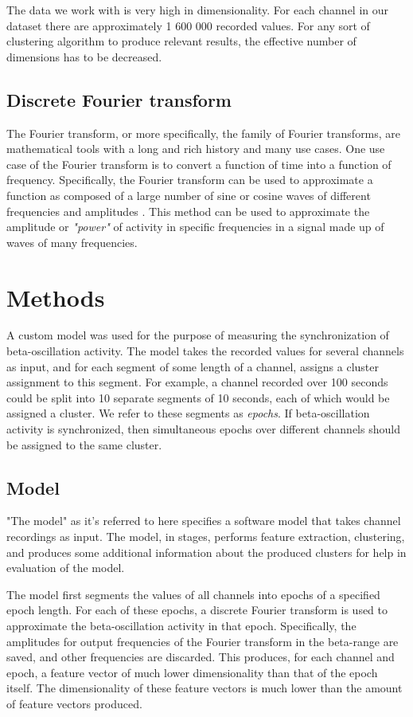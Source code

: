 \documentclass{article}
\begin{document}
The data we work with is very high in dimensionality. For each channel in our dataset there are approximately 1 600 000 recorded values. For any sort of clustering algorithm to produce relevant results, the effective number of dimensions has to be decreased. 

\subsection{Discrete Fourier transform}
The Fourier transform, or more specifically, the family of Fourier transforms, are mathematical tools with a long and rich history and many use cases. One use case of the Fourier transform is to convert a function of time into a function of frequency. Specifically, the Fourier transform can be used to approximate a function as composed of a large number of sine or cosine waves of different frequencies and amplitudes \citep{Fourier}. This method can be used to approximate the amplitude or \textit{"power"} of activity in specific frequencies in a signal made up of waves of many frequencies. 

\newpage
\section{Methods}
A custom model was used for the purpose of measuring the synchronization of beta-oscillation activity. The model takes the recorded values for several channels as input, and for each segment of some length of a channel, assigns a cluster assignment to this segment. For example, a channel recorded over 100 seconds could be split into 10 separate segments of 10 seconds, each of which would be assigned a cluster. We refer to these segments as \textit{epochs}. If beta-oscillation activity is synchronized, then simultaneous epochs over different channels should be assigned to the same cluster.

\subsection{Model}
"The model" as it's referred to here specifies a software model that takes channel recordings as input. The model, in stages, performs feature extraction, clustering, and produces some additional information about the produced clusters for help in evaluation of the model. 

The model first segments the values of all channels into epochs of a specified epoch length. For each of these epochs, a discrete Fourier transform is used to approximate the beta-oscillation activity in that epoch. Specifically, the amplitudes for output frequencies of the Fourier transform in the beta-range are saved, and other frequencies are discarded. This produces, for each channel and epoch, a feature vector of much lower dimensionality than that of the epoch itself. The dimensionality of these feature vectors is much lower than the amount of feature vectors produced. 
\end{document}
